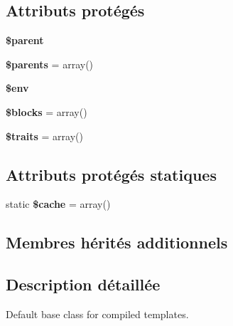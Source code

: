 \subsection*{Attributs protégés}
\begin{DoxyCompactItemize}
\item 
{\bfseries \$parent}\hypertarget{class_twig___template_a4e2313a4b35b72a06ac45fd38960f677}{}\label{class_twig___template_a4e2313a4b35b72a06ac45fd38960f677}

\item 
{\bfseries \$parents} = array()\hypertarget{class_twig___template_aaccf6ab4a29a043ae88aa27a3cc974b4}{}\label{class_twig___template_aaccf6ab4a29a043ae88aa27a3cc974b4}

\item 
{\bfseries \$env}\hypertarget{class_twig___template_aa99ce9ae015e958eef5782267276fbb4}{}\label{class_twig___template_aa99ce9ae015e958eef5782267276fbb4}

\item 
{\bfseries \$blocks} = array()\hypertarget{class_twig___template_a320aeae1df42ee73ab4b3d9f7cf4ef3f}{}\label{class_twig___template_a320aeae1df42ee73ab4b3d9f7cf4ef3f}

\item 
{\bfseries \$traits} = array()\hypertarget{class_twig___template_a00d691d7d5290df7d075c00deb62dd1b}{}\label{class_twig___template_a00d691d7d5290df7d075c00deb62dd1b}

\end{DoxyCompactItemize}
\subsection*{Attributs protégés statiques}
\begin{DoxyCompactItemize}
\item 
static {\bfseries \$cache} = array()\hypertarget{class_twig___template_ac2dc76d756ec398393d4b1d23659276c}{}\label{class_twig___template_ac2dc76d756ec398393d4b1d23659276c}

\end{DoxyCompactItemize}
\subsection*{Membres hérités additionnels}


\subsection{Description détaillée}
Default base class for compiled templates.

